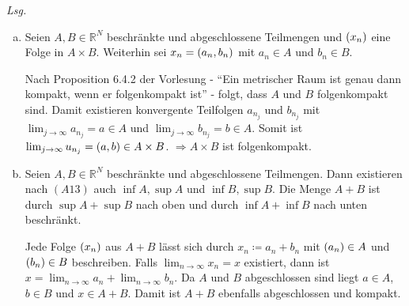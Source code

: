 \documentclass{scrreprt}
\begin{document}
\textit{Lsg.}
\begin{enumerate}[a)]
\item Seien $A, B \in \mathbb{R}^N$ beschränkte und abgeschlossene Teilmengen
  und $\qty(x_n)$ eine Folge in $A \times B$.
  Weiterhin sei $x_n = \qty(a_n, b_n)$ mit $a_n \in A$ und $b_n \in B$.

  Nach Proposition 6.4.2 der Vorlesung -
  ``Ein metrischer Raum ist genau dann kompakt, wenn er folgenkompakt ist'' -
  folgt, dass $A$ und $B$ folgenkompakt sind.
  Damit existieren konvergente Teilfolgen $a_{n_j}$ und $b_{n_j}$ mit
  $\lim_{j \to \infty} a_{n_j} = a \in A$ und $\lim_{j \to \infty} b_{n_j} = b \in A$.
  Somit ist $\lim_{j \to \infty} u_{n_j} = \qty(a, b) \in A \times B$.
  $\Rightarrow A \times B$ ist folgenkompakt.

\item Seien $A, B \in \mathbb{R}^N$ beschränkte und abgeschlossene Teilmengen.
  Dann existieren nach $(A13)$ auch $\inf A, \sup A$ und $\inf B, \sup B$.
  Die Menge $A + B$ ist durch $\sup A + \sup B$ nach oben und durch
  $\inf A + \inf B$ nach unten beschränkt.

  Jede Folge $\qty(x_n)$ aus $A + B$ lässt sich durch $x_n \coloneqq a_n + b_n$
  mit $\qty(a_n) \in A$ und $\qty(b_n) \in B$ beschreiben.
  Falls $\lim_{n \to \infty} x_n = x$ existiert, dann ist
  $x = \lim_{n \to \infty} a_n + \lim_{n \to \infty} b_n$.
  Da $A$ und $B$ abgeschlossen sind liegt $a \in A$, $b \in B$
  und $x \in A + B$.
  Damit ist $A + B$ ebenfalls abgeschlossen und kompakt.
\end{enumerate}
\end{document}
